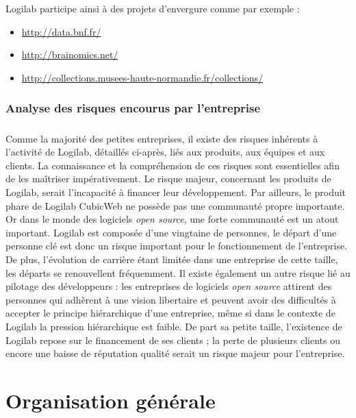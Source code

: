 \documentclass {report}
\begin{document}

    Logilab participe ainsi à des projets d'envergure comme par exemple :
\begin{itemize}
\item \url{http://data.bnf.fr/}
\item \url{http://brainomics.net/}
\item \url{http://collections.musees-haute-normandie.fr/collections/}
\end{itemize}

\subsection{Analyse des risques encourus par l'entreprise}
\paragraph{}
Comme la majorité des petites entreprises, il existe des risques inhérents à l'activité de Logilab, détaillés ci-après, liés aux produits, aux équipes et aux clients. La connaissance et la compréhension de ces risques sont essentielles afin de les maîtriser impérativement. Le risque majeur, concernant les produits de Logilab, serait l'incapacité à financer leur développement. Par ailleurs, le produit phare de Logilab CubicWeb ne possède pas une communauté propre importante. Or dans le monde des logiciels \textit{open source}, une forte communauté est un atout important. Logilab est composée d'une vingtaine de personnes, le départ d'une personne clé est donc un risque important pour le fonctionnement de l'entreprise. De plus, l'évolution de carrière étant limitée dans une entreprise de cette taille, les départs se renouvellent fréquemment. Il existe également un autre risque lié au pilotage des développeurs : les entreprises de logiciels \textit{open source} attirent des personnes qui adhèrent à une vision libertaire et peuvent avoir des difficultés à accepter le principe hiérarchique d'une entreprise, même si dans le contexte de Logilab la pression hiérarchique est faible. De part sa petite taille, l'existence de Logilab repose sur le financement de ses clients ; la perte de plusieurs clients ou encore une baisse de réputation qualité serait un risque majeur pour l'entreprise.


\chapter{Organisation générale}
\end{document}
